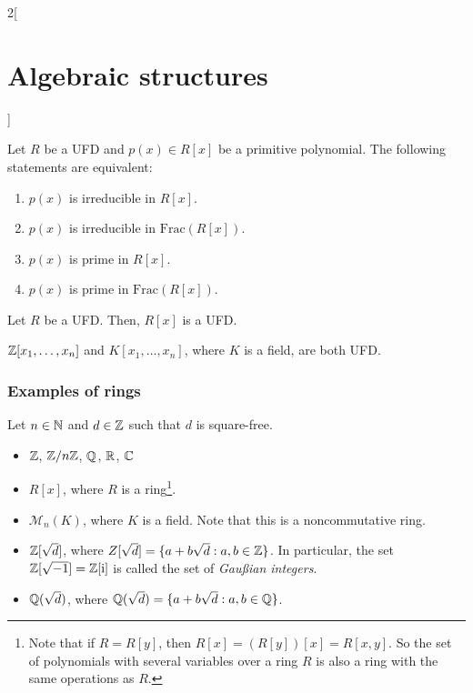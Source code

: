 \documentclass[../../../main.tex]{subfiles}
\begin{document}
\begin{multicols}{2}[\section{Algebraic structures}]
    \begin{prop}
        Let $R$ be a UFD and $p(x)\in R[x]$ be a primitive polynomial. The following statements are equivalent:
        \begin{enumerate}
            \item $p(x)$ is irreducible in $R[x]$.
            \item $p(x)$ is irreducible in $\mathrm{Frac}(R[x])$.
            \item $p(x)$ is prime in $R[x]$.
            \item $p(x)$ is prime in $\mathrm{Frac}(R[x])$.
        \end{enumerate}
    \end{prop}
    \begin{theorem}
        Let $R$ be a UFD. Then, $R[x]$ is a UFD.
    \end{theorem}
    \begin{corollary}
        $\mathbb{Z}[x_1,\ldots,x_n]$ and $K[x_1,\ldots,x_n]$, where $K$ is a field, are both UFD.
    \end{corollary}
    \subsubsection{Examples of rings}\label{AS-examples2}
    Let $n\in\mathbb{N}$ and $d\in\mathbb{Z}$ such that $d$ is square-free.
    \begin{itemize}
        \item $\mathbb{Z}$, $\mathbb{Z}/n\mathbb{Z}$, $\mathbb{Q}$, $\mathbb{R}$, $\mathbb{C}$
        \item $R[x]$, where $R$ is a ring\footnote{Note that if $R=R[y]$, then $R[x]=(R[y])[x]=R[x,y]$. So the set of polynomials with several variables over a ring $R$ is also a ring with the same operations as $R$.}.
        \item $\mathcal{M}_n(K)$, where $K$ is a field. Note that this is a noncommutative ring.
        \item $\mathbb{Z}[\sqrt{d}]$, where $Z[\sqrt{d}]=\{a+b\sqrt{d}:a,b\in\mathbb{Z}\}$. In particular, the set $\mathbb{Z}[\sqrt{-1}]=\mathbb{Z}[\mathrm{i}]$ is called the set of \textit{Gau\ss ian integers}.
        \item $\mathbb{Q}(\sqrt{d})$, where $\mathbb{Q}(\sqrt{d})=\{a+b\sqrt{d}:a,b\in\mathbb{Q}\}$.
    \end{itemize}
    \begin{center}
        \begin{minipage}{\linewidth}
            \centering
            
        \end{minipage}
    \end{center}
\end{multicols}
\end{document}
